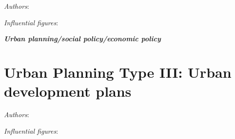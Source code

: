 \documentclass{article}
\newcommand{\bisection}[1]{\textbf{\textit{#1}}}
\begin{document}
\textit{Authors}:

\textit{Influential figures}:

\bisection{Urban planning/social policy/economic policy}


\section{Urban Planning Type III: Urban development plans}

\textit{Authors}:

\textit{Influential figures}:


\printbibliography
\end{document}

